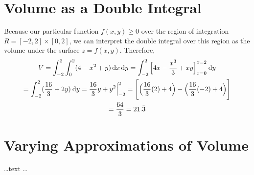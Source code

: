 \documentclass{article}
\begin{document}
\section{Volume as a Double Integral}
    Because our particular function $f(x,y) \geq 0$ over the region of integration \\
    $R = [-2, 2] \times [0, 2]$, we can
    interpret the double integral over this region as the volume under the surface $z = f(x, y)$. Therefore, 
\begin{gather}
    \notag{V = \int_{-2}^2 \int_0^2 (4 - x^2 + y) \, \mathrm{d}x \, \mathrm{d}y = \int_{-2}^2 \Big[ 4x - \frac{x^3}{3} + xy \Big]_{x = 0}^{x = 2} \: \mathrm{d}y} \\
    \notag{= \int_{-2}^2 (\frac{16}{3} + 2y) \: \mathrm{d}y = \frac{16}{3}y + y^2 \Big|_{-2}^{2} = \Bigg[\Big(\frac{16}{3}(2) + 4\Big) - \Big(\frac{16}{3}(-2) + 4\Big)\Bigg]} \\
    \notag{= \frac{64}{3} = 21.\bar{3}}
\end{gather}

\section{Varying Approximations of Volume}
    \ldots text \ldots
\end{document}
